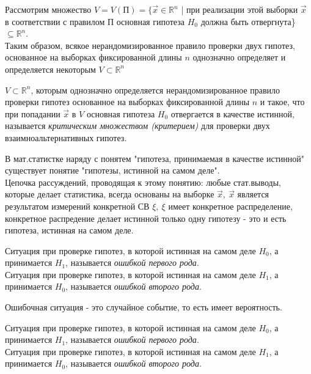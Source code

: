 Рассмотрим множество $V=V(\text{П})=\{\overrightarrow{x} \in \mathbb{R}^n$ | при реализации этой выборки $\overrightarrow{x}$
в соответствии с правилом П основная гипотеза $H_0$ должна быть отвергнута\} $\subseteq \mathbb{R}^n$.\\
Таким образом, всякое нерандомизированное правило проверки двух гипотез, основанное на выборках фиксированной длины $n$
однозначно определяет и определяется некоторым $V \subset \mathbb{R}^n$

\begin{defs}
    $V \subset \mathbb{R}^n$, которым однозначно определяется нерандомизированное правило проверки гипотез
    основанное на выборках фиксированной длины $n$ и такое, что при попадании $\overrightarrow{x}$ в $V$ основная
    гипотеза $H_0$ отвергается в качестве истинной, называется \textit{критическим множеством (критерием)} для
    проверки двух взаимноальтернативных гипотез.
\end{defs}

В мат.статистке наряду с понятем "гипотеза, принимаемая в качестве истинной" существует
понятие "гипотезы, истинной на самом деле".\\
Цепочка рассуждений, проводящая к этому понятию: любые стат.выводы, которые делает статистика,
всегда основаны на выборке $\overrightarrow{x}, \ \overrightarrow{x}$ является результатом измерений
конкретной СВ $\xi, \ \xi$ имеет конкретное распределение, конкретное распредение делает
истинной только одну гипотезу - это и есть гипотеза, истинная на самом деле.

\begin{defs}
    Ситуация при проверке гипотез, в которой истинная на самом деле $H_0$, а принимается $H_1$,
    называется \textit{ошибкой первого рода}.\\
    Ситуация при проверке гипотез, в которой истинная на самом деле $H_1$, а принимается $H_0$,
    называется \textit{ошибкой второго рода}.
\end{defs}

Ошибочная ситуация - это случайное событие, то есть имеет вероятность.

\begin{defs}
    Ситуация при проверке гипотез, в которой истинная на самом деле $H_0$, а принимается $H_1$,
    называется \textit{ошибкой первого рода}.\\
    Ситуация при проверке гипотез, в которой истинная на самом деле $H_1$, а принимается $H_0$,
    называется \textit{ошибкой второго рода}.
\end{defs}


